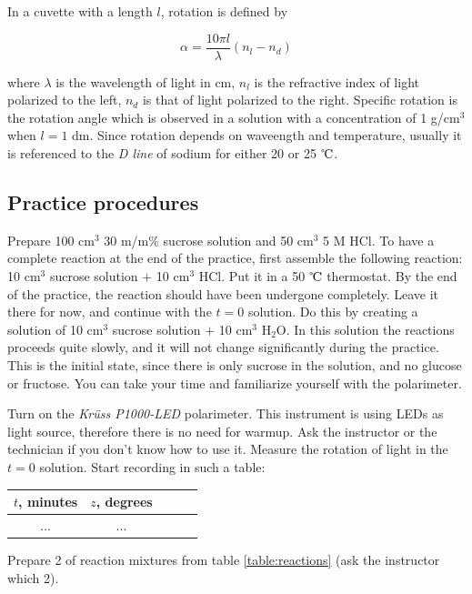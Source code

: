 In a cuvette with a length $l$, rotation is defined by

\begin{equation}
\label{fig:rotation}
	\alpha
	=\frac{10 \pi l}{\lambda}
	(n_l -  n_d)
\end{equation}

where $\lambda$ is the wavelength of light in cm, $n_l$ is the refractive index of light polarized to the left, $n_d$ is that of light polarized to the right.
Specific rotation is the rotation angle which is observed in a solution with a concentration of 1 g/cm$^3$ when $l = 1$ dm.
Since rotation depends on waveength and temperature, usually it is referenced to the \emph{D line} of sodium for either 20 or 25 $\celsius$.


\subsection{Practice procedures}
Prepare 100 cm$^3$ 30 m/m\% sucrose solution and 50 cm$^3$ 5 M HCl. To have a complete reaction at the end of the practice, first assemble the following reaction: 10 cm$^3$ sucrose solution $+$ 10 cm$^3$ HCl. Put it in a 50 $\celsius$ thermostat. By the end of the practice, the reaction should have been undergone completely. Leave it there for now, and continue with the $t = 0$ solution. Do this by creating a solution of 10 cm$^3$ sucrose solution $+$ 10 cm$^3$ H$_2$O. In this solution the reactions proceeds quite slowly, and it will not change significantly during the practice. This is the initial state, since there is only sucrose in the solution, and no glucose or fructose. You can take your time and familiarize yourself with the polarimeter.

Turn on the \emph{Krüss P1000-LED} polarimeter. This instrument is using LEDs as light source, therefore there is no need for warmup. Ask the instructor or the technician if you don't know how to use it. Measure the rotation of light in the $t = 0$ solution. Start recording in such a table:

\begin{center}
\begin{tabular}{|c|c|c|c|c|}
\hline
$t$, minutes & $z$, degrees \\
\hline
... & ... \\
\end{tabular}
\end{center}
 
Prepare 2 of reaction mixtures from table \ref{table:reactions} (ask the instructor which 2).

